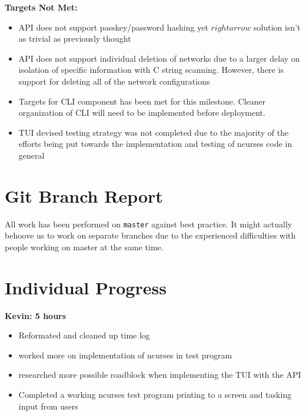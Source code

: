 \documentclass[11pt]{article}
\begin{document}
\textbf{Targets Not Met:}
\begin{itemize}
  \item API does not support passkey/password hashing yet $rightarrow$ solution isn't as trivial as previously
    thought
  \item API does not support individual deletion of networks due to a larger delay on isolation of specific information
    with C string scanning. However, there is support for deleting all of the network configurations
  \item Targets for CLI component has been met for this milestone. Cleaner organization of CLI will need to be implemented 
    before deployment. 
  \item TUI devised testing strategy was not completed due to the majority of the efforts being put towards the
    implementation and testing of ncurses code in general 
\end{itemize}


\section{Git Branch Report}
All work has been performed on \texttt{master} against best practice. It might actually behoove us to
work on separate branches due to the experienced difficulties with people working on master at the same
time.


\section{Individual Progress}

\textbf{Kevin: 5 hours}
\begin{itemize}
  \item Reformated and cleaned up time log
  \item worked more on implementation of ncurses in test program
  \item researched more possible roadblock when implementing the TUI with the API
  \item Completed a working ncurses test program printing to a screen and tasking input from users
\end{itemize}
\end{document}
